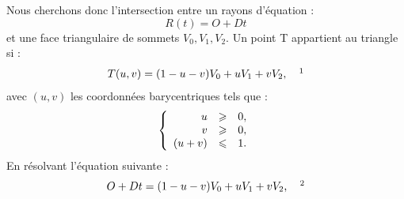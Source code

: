 Nous cherchons donc l'intersection entre un rayons d'équation : 
\begin{equation}
R(t) = O + Dt
\end{equation}
%
et une face triangulaire de sommets $ V_0, V_1, V_2$. Un point T appartient au triangle si : 
%
\begin{equation} \label{eq_2moller}
T(u,v) = (1-u-v)V_0 + uV_1 + vV_2, \ \ \ \footnotemark
\end{equation}
%
avec $(u,v)$ les coordonnées barycentriques tels que :
\begin{equation}
   \left \{
   \begin{array}{r c l}
u & \geqslant & 0,  \\
v & \geqslant & 0,  \\
(u+v) & \leqslant & 1.
   \end{array}
   \right .
\end{equation}
%
En résolvant l'équation suivante :
\begin{equation}
O + Dt = (1-u-v)V_0 + uV_1 + vV_2, \ \ \ \footnotemark
\end{equation}
%
%
